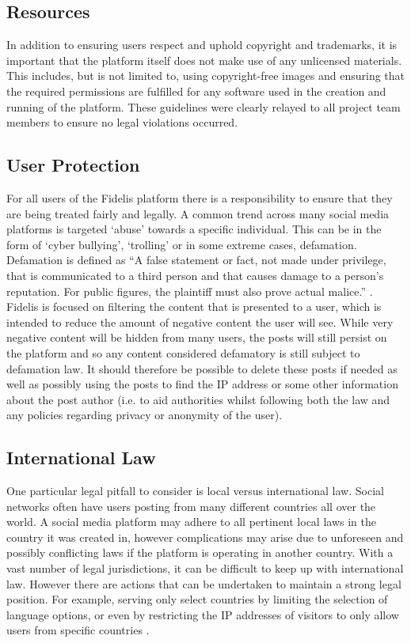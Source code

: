 \subsection{Resources}
In addition to ensuring users respect and uphold copyright and trademarks, it is important that the platform itself does not make use of any unlicensed materials. This includes, but is not limited to, using copyright-free images and ensuring that the required permissions are fulfilled for any software used in the creation and running of the platform. These guidelines were clearly relayed to all project team members to ensure no legal violations occurred.

\subsection{User Protection}
For all users of the Fidelis platform there is a responsibility to ensure that they are being treated fairly and legally. A common trend across many social media platforms is targeted `abuse' towards a specific individual. This can be in the form of `cyber bullying', `trolling’ or in some extreme cases, defamation. Defamation is defined as ``A false statement or fact, not made under privilege, that is communicated to a third person and that causes damage to a person’s reputation. For public figures, the plaintiff must also prove actual malice.'' \cite{BusinessLawToday}. Fidelis is focused on filtering the content that is presented to a user, which is intended to reduce the amount of negative content the user will see. While very negative content will be hidden from many users, the posts will still persist on the platform and so any content considered defamatory is still subject to defamation law. It should therefore be possible to delete these posts if needed as well as possibly using the posts to find the IP address or some other information about the post author (i.e. to aid authorities whilst following both the law and any policies regarding privacy or anonymity of the user).

\subsection{International Law}
One particular legal pitfall to consider is local versus international law. Social networks often have users posting from many different countries all over the world. A social media platform may adhere to all pertinent local laws in the country it was created in, however complications may arise due to unforeseen and possibly conflicting laws if the platform is operating in another country. With a vast number of legal jurisdictions, it can be difficult to keep up with international law. However there are actions that can be undertaken to maintain a strong legal position. For example, serving only select countries by limiting the selection of language options, or even by restricting the IP addresses of visitors to only allow users from specific countries \cite{Olswang}.

